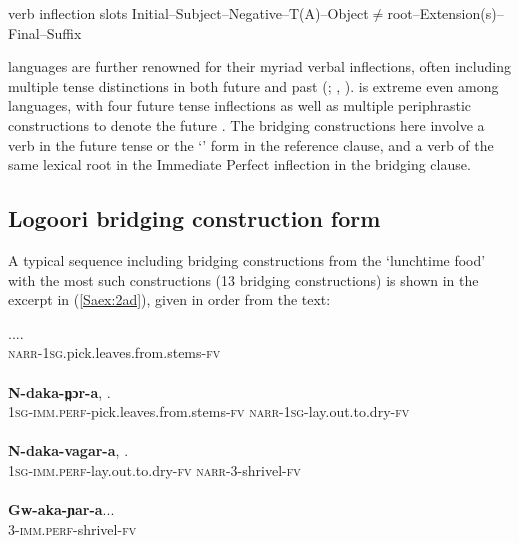 \documentclass[output=paper]{LSP/langsci}
\begin{document}
\begin{exe}
	\ex	\label{Saex:2}
{ verb inflection slots}{}{\citep[][90]{Nurse2003}}
		\glt	Initial--Subject--Negative--T(A)--Object$\neq$root--Extension(s)--Final--Suffix
\end{exe}


 languages are further renowned for their myriad verbal inflections, often including multiple tense distinctions in both future and past (\citealt{Botne2008}; \citealt{Nurse2003}, \citealt{Nurse2008}).  is extreme even among  languages, with four future tense inflections as well as multiple periphrastic constructions to denote the future \citep{Sarvasy2016}. The  bridging constructions here involve a verb in the future tense or the `' form in the reference clause, and a verb of the same lexical root in the Immediate Perfect inflection in the bridging clause. 
%
\subsection{Logoori bridging construction form}
\label{Sa21form}
A typical sequence including bridging constructions from the  `lunchtime food' \citep{Chesi2014} with the most such constructions (13 bridging constructions) is shown in the excerpt in (\ref{Saex:2ad}), given in order from the text:


\begin{exe}
\ex \label{Saex:2ad}
\begin{xlist}
\ex \label{Saex:2a}
\gll ...\underline{}.\\
\textsc{narr}-\textsc{1sg.}pick.leaves.from.stems\textsc{-fv}\\
\glt {}\\
\ex \label{Saex:2b}
\gll \textbf{N-daka-n̪ɔr-a},          \underline{}.\\
1\textsc{sg}-\textsc{imm.perf-}pick.leaves.from.stems-\textsc{fv}  \textsc{narr}-\textsc{1sg}-lay.out.to.dry-\textsc{fv}\\
\glt {}\\
\ex \label{Saex:2c}
\gll \textbf{N-daka-vagar-a},      \underline{}.\\
\textsc{1sg-imm.perf-}lay.out.to.dry-\textsc{fv}  \textsc{narr}-3-shrivel-\textsc{fv}\\
\glt {}\\
\ex \label{Saex:2d}
\gll \textbf{Gw-aka-ɲar-a}...\\     	       
    3-\textsc{imm.perf-}shrivel-\textsc{fv}\\
\glt {} 
\end{xlist}
\end{exe}
\end{document}
